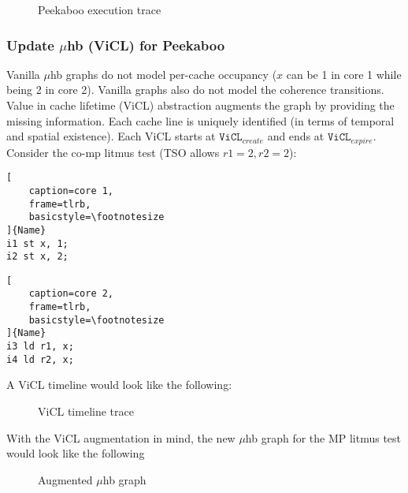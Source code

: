 \documentclass{article}
\begin{document}
\begin{multicols*}{2}
\begin{figure}[H]
  \caption{Peekaboo execution trace}
\end{figure}

\subsubsection{Update $\mu$hb (ViCL) for Peekaboo}
Vanilla $\mu$hb graphs do not model per-cache occupancy ($x$ can be 1 in core 1 while being 2 in core 2). Vanilla graphs also do not model the coherence transitions. Value in cache lifetime (ViCL) abstraction augments the graph by providing the missing information.
\medskip\noindent\newline
Each cache line is uniquely identified (in terms of temporal and spatial existence). Each ViCL starts at $\texttt{ViCL}_{create}$ and ends at $\texttt{ViCL}_{expire}$.
\medskip\noindent\newline
Consider the co-mp litmus test (TSO allows $r1=2, r2=2$):

\noindent\begin{minipage}{.2\textwidth}
\captionsetup{labelformat=empty}
\begin{lstlisting}[
    caption=core 1,
    frame=tlrb, 
    basicstyle=\footnotesize
]{Name}
i1 st x, 1;
i2 st x, 2;
\end{lstlisting}
\end{minipage}\hfill
\begin{minipage}{.2\textwidth}
\captionsetup{labelformat=empty}
\begin{lstlisting}[
    caption=core 2,
    frame=tlrb,
    basicstyle=\footnotesize
]{Name}
i3 ld r1, x;
i4 ld r2, x;
\end{lstlisting}
\end{minipage}

\noindent\newline
A ViCL timeline would look like the following:
\begin{figure}[H]
  \caption{ViCL timeline trace}
\end{figure}

\noindent\newline
With the ViCL augmentation in mind, the new $\mu$hb graph for the MP litmus test would look like the following

\begin{figure}[H]
  \caption{Augmented $\mu$hb graph}
\end{figure}


\end{multicols*}
\end{document}
